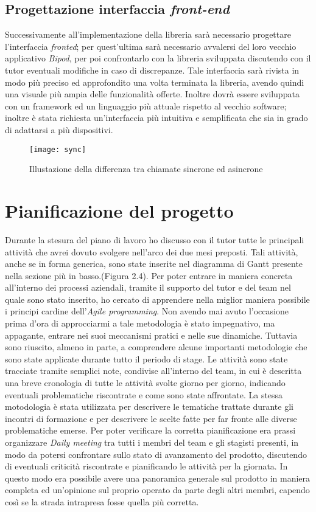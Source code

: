 \subsection{Progettazione interfaccia \textit{front-end}}
Successivamente all'implementazione della libreria sarà necessario progettare l'interfaccia \textit{fronted}; per quest'ultima sarà necessario avvalersi del loro vecchio applicativo \textit{Bipod}, per poi confrontarlo con la libreria sviluppata discutendo con il tutor eventuali modifiche in caso di discrepanze. Tale interfaccia sarà rivista in modo più preciso ed approfondito una volta terminata la libreria, avendo quindi una visuale più ampia delle funzionalità offerte. Inoltre dovrà essere sviluppata con un framework ed un linguaggio più attuale rispetto al vecchio software; inoltre è stata richiesta un'interfaccia più intuitiva e semplificata che sia in grado di adattarsi a più dispositivi.
\begin{figure}[!h] 
	\centering 
	\texttt{[image: sync]} 
	\caption{Illustazione della differenza tra chiamate sincrone ed asincrone}
\end{figure}
\newpage
\section{Pianificazione del progetto}
Durante la stesura del piano di lavoro ho discusso con il tutor tutte le principali attività che avrei dovuto svolgere nell'arco dei due mesi preposti. Tali attività, anche se in forma generica, sono state inserite nel diagramma di Gantt presente nella sezione più in basso.(Figura 2.4).
Per poter entrare in maniera concreta all'interno dei processi aziendali, tramite il supporto del tutor e del team nel quale sono stato inserito, ho cercato di apprendere nella miglior maniera possibile i principi cardine dell'\textit{Agile programming}. Non avendo mai avuto l'occasione prima d'ora di approcciarmi a tale metodologia è stato impegnativo, ma appagante, entrare nei suoi meccanismi pratici e nelle sue dinamiche. Tuttavia sono riuscito, almeno in parte, a comprendere alcune importanti metodologie che sono state applicate durante tutto il periodo di stage. Le attività sono state tracciate tramite semplici note, condivise all'interno del team, in cui è descritta una breve cronologia di tutte le attività svolte giorno per giorno, indicando eventuali problematiche riscontrate e come sono state affrontate. La stessa motodologia è stata utilizzata per descrivere le tematiche trattate durante gli incontri di formazione e per descrivere le scelte fatte per far fronte alle diverse problematiche emerse.
Per poter verificare la corretta pianificazione era prassi organizzare \textit{Daily meeting} tra tutti i membri del team e gli stagisti presenti, in modo da potersi confrontare sullo stato di avanzamento del prodotto, discutendo di eventuali criticità riscontrate e pianificando le attività per la giornata. In questo modo era possibile avere una panoramica generale sul prodotto in maniera completa ed un'opinione sul proprio operato da parte degli altri membri, capendo così se la strada intrapresa fosse quella più corretta.

